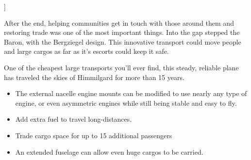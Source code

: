 \documentclass[twoside,headings,a4paper]{article}
\begin{document}
]{
    After the end, helping communities get in touch with those around them and restoring trade was one of the most important things.  Into the gap stepped the Baron, with the Bergziegel design.  This innovative transport could move people and large cargos as far as it's escorts could keep it safe.

    One of the cheapest large transports you'll ever find, this steady, reliable plane has traveled the skies of Himmilgard for more than 15 years.

    \vfill\null
    \columnbreak

    \begin{itemize}
        \item The external nacelle engine mounts can be modified to use nearly any type of engine, or even asymmetric engines while still being stable and easy to fly.
        \item Add extra fuel to travel long-distances.
        \item Trade cargo space for up to 15 additional passengers
        \item An extended fuselage can allow even huge cargos to be carried.
    \end{itemize}

    \vfill\null
}
\end{document}
